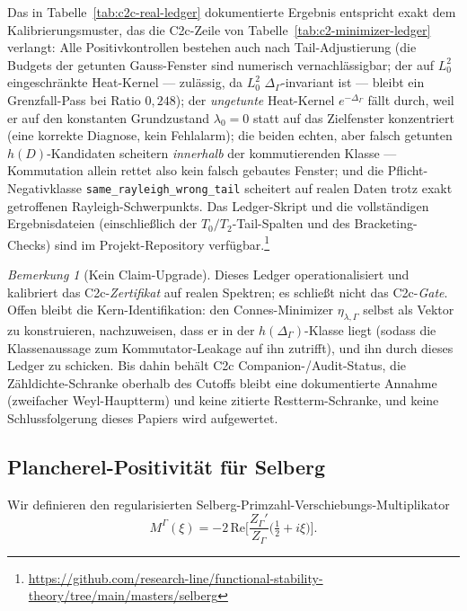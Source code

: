 \documentclass[12pt,a4paper]{article}
\theoremstyle{definition}
\theoremstyle{remark}
\newtheorem{remark}[theorem]{Bemerkung}
\newcommand{\Sel}{Z_{\Gamma}}
\newcommand{\Delop}{\Delta_{\Gamma}}
\begin{document}
Das in Tabelle~\ref{tab:c2c-real-ledger} dokumentierte Ergebnis entspricht exakt dem Kalibrierungsmuster, das die C2c-Zeile von
Tabelle~\ref{tab:c2-minimizer-ledger} verlangt: Alle Positivkontrollen
bestehen auch nach Tail-Adjustierung (die Budgets der getunten Gauss-Fenster
sind numerisch vernachlässigbar; der auf $L^2_0$ eingeschränkte Heat-Kernel
--- zulässig, da $L^2_0$ $\Delop$-invariant ist --- bleibt ein
Grenzfall-Pass bei Ratio $0{,}248$); der \emph{ungetunte} Heat-Kernel
$e^{-\Delop}$ fällt durch, weil er auf den konstanten Grundzustand
$\lambda_0=0$ statt auf das Zielfenster konzentriert (eine korrekte
Diagnose, kein Fehlalarm); die beiden echten, aber falsch getunten
$h(D)$-Kandidaten scheitern \emph{innerhalb} der kommutierenden Klasse ---
Kommutation allein rettet also kein falsch gebautes Fenster; und die
Pflicht-Negativklasse
\texttt{same\_rayleigh\_}\allowbreak\texttt{wrong\_tail} scheitert auf
realen Daten trotz exakt getroffenen Rayleigh-Schwerpunkts. Das
Ledger-Skript und die vollständigen Ergebnisdateien (einschließlich der
$T_0/T_2$-Tail-Spalten und des Bracketing-Checks) sind im Projekt-Repository
verfügbar.\footnote{\url{https://github.com/research-line/functional-stability-theory/tree/main/masters/selberg}}

\begin{remark}[Kein Claim-Upgrade]
\label{rem:ledger-no-upgrade}
Dieses Ledger operationalisiert und kalibriert das C2c-\emph{Zertifikat} auf
realen Spektren; es schließt nicht das C2c-\emph{Gate}. Offen bleibt die
Kern-Identifikation: den Connes-Minimizer $\eta_{\lambda,\Gamma}$ selbst als
Vektor zu konstruieren, nachzuweisen, dass er in der $h(\Delop)$-Klasse
liegt (sodass die Klassenaussage zum Kommutator-Leakage auf ihn zutrifft),
und ihn durch dieses Ledger zu schicken. Bis dahin behält C2c
Companion-/Audit-Status, die Zähldichte-Schranke oberhalb des Cutoffs bleibt
eine dokumentierte Annahme (zweifacher Weyl-Hauptterm) und keine zitierte
Restterm-Schranke, und keine Schlussfolgerung dieses Papiers wird
aufgewertet.
\end{remark}

\subsection{Plancherel-Positivität für Selberg}

Wir definieren den regularisierten Selberg-Primzahl-Verschiebungs-Multiplikator
\begin{equation}
\label{eq:Mxi-Sel}
M^\Gamma(\xi) = -2\,\mathrm{Re}\Big[\frac{\Sel'}{\Sel}\Big(\tfrac{1}{2}+i\xi\Big)\Big].
\end{equation}
\end{document}
